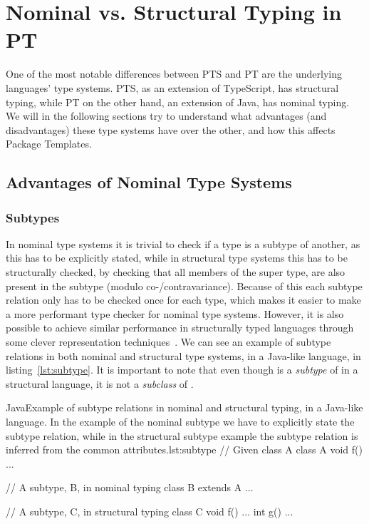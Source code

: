 
\section{Nominal vs. Structural Typing in PT}\label{sec:difference-between-pts-and-ptj}

One of the most notable differences between PTS and PT are the underlying languages' type systems.
PTS, as an extension of TypeScript, has structural typing, while PT on the other hand, an extension of Java, has nominal typing.
We will in the following sections try to understand what advantages (and disadvantages) these type systems have over the other, and how this affects Package Templates.

\subsection{Advantages of Nominal Type Systems}\label{subsec:advantages-of-nominal-types}

\subsubsection{Subtypes}\label{subsubsec:subtypes}


In nominal type systems it is trivial to check if a type is a subtype of another, as this has to be explicitly stated, while in structural type systems this has to be structurally checked, by checking that all members of the super type, are also present in the subtype (modulo co-/contravariance).
Because of this each subtype relation only has to be checked once for each type, which makes it easier to make a more performant type checker for nominal type systems.
However, it is also possible to achieve similar performance in structurally typed languages through some clever representation techniques~\cite{tapl}.
We can see an example of subtype relations in both nominal and structural type systems, in a Java-like language, in listing~\vref{lst:subtype}.
It is important to note that even though  is a \emph{subtype} of  in a structural language, it is not a \emph{subclass} of .

\begin{code}{Java}{Example of subtype relations in nominal and structural typing, in a Java-like language. In the example of the nominal subtype we have to explicitly state the subtype relation, while in the structural subtype example the subtype relation is inferred from the common attributes.}{lst:subtype}
    // Given class A
    class A {
        void f() { ... }
     }

    // A subtype, B, in nominal typing
    class B extends A { ... }

    // A subtype, C, in structural typing
    class C {
        void f() { ... }
        int g() { ... }
    }
\end{code}

